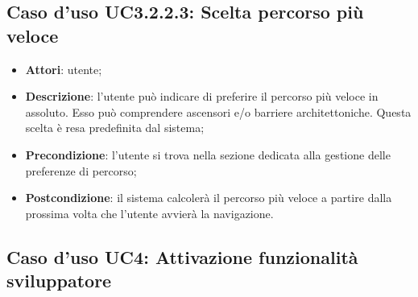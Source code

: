 \documentclass[../AnalisiDeiRequisiti.tex]{subfiles}
\begin{document}
\subsection{Caso d'uso UC3.2.2.3: Scelta percorso più veloce}
\begin{itemize}
	\item \textbf{Attori}: utente;
	\item \textbf{Descrizione}: l'utente può indicare di preferire il percorso più veloce in assoluto. Esso può comprendere ascensori e/o barriere architettoniche. Questa scelta è resa predefinita dal sistema; 
	\item \textbf{Precondizione}: l'utente si trova nella sezione dedicata alla gestione delle preferenze di percorso;
	\item \textbf{Postcondizione}: il sistema calcolerà il percorso più veloce a partire dalla prossima volta che l'utente avvierà la navigazione.
\end{itemize}
\hypertarget{UC4}{}
\subsection{Caso d'uso UC4: Attivazione funzionalità sviluppatore}
\end{document}
